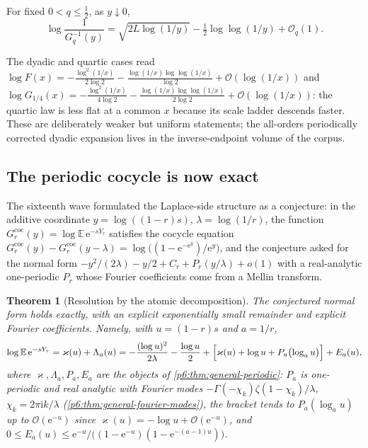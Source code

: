 \documentclass[11pt,oneside]{article}
\numberwithin{equation}{section}
\newtheorem{theorem}{Theorem}[section]
\theoremstyle{definition}
\theoremstyle{remark}
\newcommand{\E}{\mathbb E}
\newcommand{\e}{\mathrm e}
\newcommand{\ii}{\mathrm i}
\newcommand{\bigO}{\mathcal O}
\newcommand{\smallo}{o}
\begin{document}
\begin{corollary}
\label{p7:cor:inverse-asymptotic}
For fixed $0<q\le\tfrac12$, as $y\downarrow0$,
\begin{equation}\label{p7:eq:inverse-asymptotic}
 \log\frac1{G_q^{-1}(y)}
 =\sqrt{2L\log(1/y)}-\tfrac12\log\log(1/y)+\bigO_q(1).
\end{equation}
\end{corollary}

The dyadic and quartic cases read
$\log F(x)=-\tfrac{\log^2(1/x)}{2\log2}-\tfrac{\log(1/x)\log\log(1/x)}{\log2}
+\bigO(\log(1/x))$ and
$\log G_{1/4}(x)=-\tfrac{\log^2(1/x)}{4\log2}
-\tfrac{\log(1/x)\log\log(1/x)}{2\log2}+\bigO(\log(1/x))$: the quartic law is
less flat at a common $x$ because its scale ladder descends faster.  These
are deliberately weaker but uniform statements; the all-orders periodically
corrected dyadic expansion lives in the inverse-endpoint volume of the
corpus.

\subsection{The periodic cocycle is now exact}

The sixteenth wave formulated the Laplace-side structure as a conjecture: in
the additive coordinate $y=\log((1-r)s)$, $\lambda=\log(1/r)$, the function
$G_r^{\mathrm{coc}}(y)=\log\E\,\e^{-sY_r}$ satisfies the cocycle equation
$G^{\mathrm{coc}}_r(y)-G^{\mathrm{coc}}_r(y-\lambda)
=\log\bigl((1-\e^{-\e^y})/\e^y\bigr)$, and the conjecture asked for the
normal form
$-y^2/(2\lambda)-y/2+C_r+P_r(y/\lambda)+\smallo(1)$ with a real-analytic
one-periodic $P_r$ whose Fourier coefficients come from a Mellin transform.

\begin{theorem}[Resolution by the atomic decomposition]
\label{p7:thm:cocycle-resolved}
The conjectured normal form holds exactly, with an explicit exponentially
small remainder and explicit Fourier coefficients.  Namely, with
$u=(1-r)s$ and $a=1/r$,
\begin{equation}\label{p7:eq:cocycle-exact}
 \log\E\,\e^{-sY_r}
 =\varkappa(u)+\Lambda_{a}(u)
 =-\frac{(\log u)^2}{2\lambda}-\frac{\log u}{2}
 +\Bigl[\varkappa(u)+\log u+P_{a}\bigl(\log_{a}u\bigr)\Bigr]
 +E_{a}(u),
\end{equation}
where $\varkappa,\Lambda_a,P_a,E_a$ are the objects of
\cref{p6:thm:general-periodic}: $P_{a}$ is one-periodic and real analytic
with Fourier modes $-\Gamma(-\chi_k)\zeta(1-\chi_k)/\lambda$,
$\chi_k=2\pi\ii k/\lambda$ (\cref{p6:thm:general-fourier-modes}), the bracket
tends to $P_a(\log_au)$ up to $\bigO(\e^{-u})$ since
$\varkappa(u)=-\log u+\bigO(\e^{-u})$, and
$0\le E_{a}(u)\le\e^{-u}/\bigl((1-\e^{-u})(1-\e^{-(a-1)u})\bigr)$.
\end{theorem}
\end{document}
